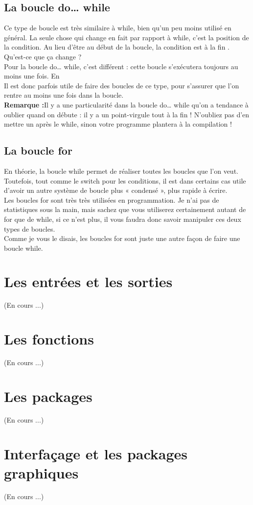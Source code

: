 \subsection{La boucle do… while}
Ce type de boucle est très similaire à while, bien qu'un peu moins utilisé en général.
La seule chose qui change en fait par rapport à while, c'est la position de la condition. Au lieu d'être au début de la boucle, la condition est à la fin .
\\[0.5cm]
Qu'est-ce que ça change ?
\\[0.5cm]
Pour la boucle do… while, c'est différent : cette boucle s'exécutera toujours au moins une fois. En 
\\[0.5cm]
Il est donc parfois utile de faire des boucles de ce type, pour s'assurer que l'on rentre au moins une fois dans la boucle.
\\[0.5cm]
\textbf{Remarque :}Il y a une particularité dans la boucle do… while qu'on a tendance à oublier quand on débute : il y a un point-virgule tout à la fin ! N'oubliez pas d'en mettre un après le while, sinon votre programme plantera à la compilation !
\\[0.5cm]
\subsection{La boucle for}
En théorie, la boucle while permet de réaliser toutes les boucles que l'on veut.\\
Toutefois, tout comme le switch pour les conditions, il est dans certains cas utile d'avoir un autre système de boucle plus « condensé », plus rapide à écrire.
\\[0.5cm]
Les boucles for sont très très utilisées en programmation. Je n'ai pas de statistiques sous la main, mais sachez que vous utiliserez certainement autant de for que de while, si ce n'est plus, il vous faudra donc savoir manipuler ces deux types de boucles.
\\[0.5cm]
Comme je vous le disais, les boucles for sont juste une autre façon de faire une boucle while.
\\[0.5cm]

\section{Les entrées et les sorties}
(En cours ...)
\section{Les fonctions}
(En cours ...)
\section{Les packages}
(En cours ...)
\section{Interfaçage et les packages graphiques}
(En cours ...)